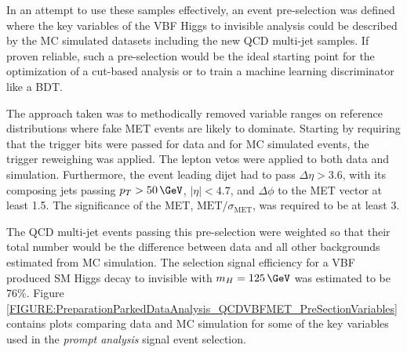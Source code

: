
In an attempt to use these samples effectively, an event pre-selection was defined where the key variables of the \gls{VBF} Higgs to invisible analysis could be described by the \gls{MC} simulated datasets including the new \gls{QCD} multi-jet samples. If proven reliable, such a pre-selection would be the ideal starting point for the optimization of a cut-based analysis or to train a machine learning discriminator like a \gls{BDT}.

The approach taken was to methodically removed variable ranges on reference distributions where fake \gls{MET} events are likely to dominate. Starting by requiring that the trigger bits were passed for data and for \gls{MC} simulated events, the trigger reweighing was applied. The lepton vetos were applied to both data and simulation. Furthermore, the event leading dijet had to pass $\Delta\eta>3.6$, with its composing jets passing $p_T>50\,\GeV$, $|\eta|<4.7$, and $\Delta\phi$ to the \gls{MET} vector at least 1.5. The significance of the \gls{MET}, $\text{MET}/\sigma_{\text{MET}}$, was required to be at least 3. 

The \gls{QCD} multi-jet events passing this pre-selection were weighted so that their total number would be the difference between data and all other backgrounds estimated from \gls{MC} simulation. The selection signal efficiency for a \gls{VBF} produced \gls{SM} Higgs decay to invisible with $m_H=125\,\GeV$ was estimated to be 76\%. Figure \ref{FIGURE:PreparationParkedDataAnalysis_QCDVBFMET_PreSectionVariables} contains plots comparing data and \gls{MC} simulation for some of the key variables used in the \textit{prompt analysis} signal event selection.

%
%

